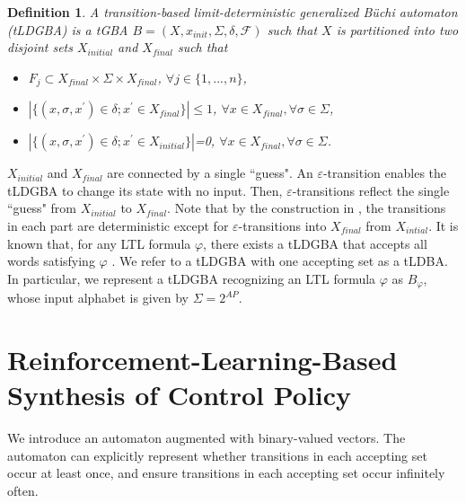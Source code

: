 \documentclass[letterpaper, 10 pt, conference]{ieeeconf}  %
\newtheorem{definition}{Definition}
\begin{document}
\begin{definition}
  A transition-based limit-deterministic generalized B\"{u}chi automaton (tLDGBA) is a tGBA $B = (X, x_{init},\Sigma,\delta,\mathcal{F})$ such that $X$ is partitioned into two disjoint sets $X_{initial}$ and $X_{final}$ such that
  \begin{itemize}
    \item $F_j \subset X_{final} \times \Sigma \times X_{final}$, $\forall j \in \{ 1,...,n \}$,
    \item $| \{ (x, \sigma, x^{\prime}) \in \delta; x^{\prime} \in X_{final} \} | \! \leq \! 1$, $\forall x \! \in \! X_{final}, \forall \sigma \! \in \! \Sigma$,
    \item $| \{ (x, \sigma, x^{\prime}) \in \delta; x^{\prime} \in X_{initial} \} |$=0, $\forall x \! \in \! X_{final}, \forall \sigma \! \in \! \Sigma$.
  \end{itemize}
\end{definition}
 $X_{initial}$ and $X_{final}$ are connected by a single ``guess". An $\varepsilon$-transition enables the tLDGBA to change its state with no input. Then, $\varepsilon$-transitions reflect the single ``guess" from $X_{initial}$ to $X_{final}$. Note that by the construction in \cite{SEJK2016}, the transitions in each part are deterministic except for $\varepsilon$-transitions into $X_{final}$ from $X_{intial}$.
It is known that, for any LTL formula $ \varphi $, there exists a tLDGBA that accepts all words satisfying $\varphi$ \cite{SEJK2016}. We refer to a tLDGBA with one accepting set as a tLDBA.
In particular, we represent a tLDGBA recognizing an LTL formula $\varphi$ as $B_{\varphi}$, whose input alphabet is given by $ \Sigma = 2^{AP} $.

\section{Reinforcement-Learning-Based Synthesis of Control Policy}
We introduce an automaton augmented with binary-valued vectors. The automaton can explicitly represent whether transitions in each accepting set occur at least once, and ensure transitions in each accepting set occur infinitely often.
\end{document}

